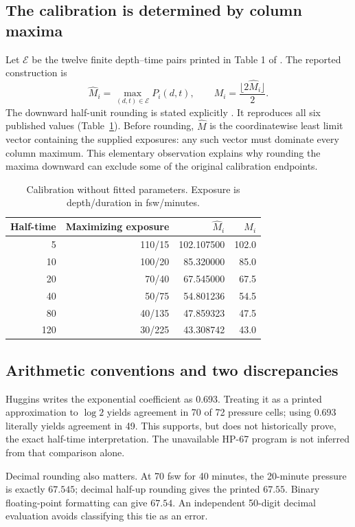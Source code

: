\documentclass[11pt,letterpaper]{article}
\begin{document}
\subsection{The calibration is determined by column maxima}
Let $\mathcal E$ be the twelve finite depth--time pairs printed in Table 1 of \cite{Huggins1981}. The reported construction is
\begin{equation}
\widehat M_i=\max_{(d,t)\in\mathcal E}P_i(d,t),
\qquad M_i=\frac{\lfloor2\widehat M_i\rfloor}{2}.
\label{eq:calibration}
\end{equation}
The downward half-unit rounding is stated explicitly \cite[p.~5]{Huggins1981}. It reproduces all six published values (Table~\ref{tab:limits}). Before rounding, $\widehat M$ is the coordinatewise least limit vector containing the supplied exposures: any such vector must dominate every column maximum. This elementary observation explains why rounding the maxima downward can exclude some of the original calibration endpoints.

\begin{table}[ht]\centering
\caption{Calibration without fitted parameters. Exposure is depth/duration in fsw/minutes.}\label{tab:limits}
\begin{tabular}{@{}rrrr@{}}\toprule
Half-time&Maximizing exposure&$\widehat M_i$&$M_i$\\\midrule
5&110/15&102.107500&102.0\\
10&100/20&85.320000&85.0\\
20&70/40&67.545000&67.5\\
40&50/75&54.801236&54.5\\
80&40/135&47.859323&47.5\\
120&30/225&43.308742&43.0\\\bottomrule
\end{tabular}
\end{table}

\subsection{Arithmetic conventions and two discrepancies}
Huggins writes the exponential coefficient as $0.693$. Treating it as a printed approximation to $\log 2$ yields agreement in 70 of 72 pressure cells; using $0.693$ literally yields agreement in 49. This supports, but does not historically prove, the exact half-time interpretation. The unavailable HP-67 program is not inferred from that comparison alone.

Decimal rounding also matters. At 70 fsw for 40 minutes, the 20-minute pressure is exactly $67.545$; decimal half-up rounding gives the printed $67.55$. Binary floating-point formatting can give $67.54$. An independent 50-digit decimal evaluation avoids classifying this tie as an error.
\end{document}
